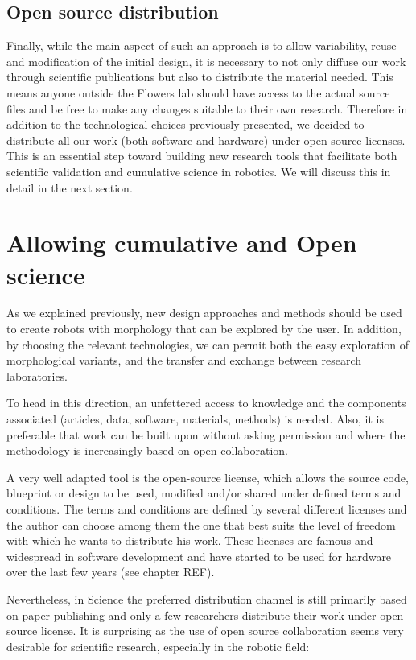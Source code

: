 \subsection{Open source distribution} %

Finally, while the main aspect of such an approach is to allow variability, reuse and modification of the initial design, it is necessary to not only diffuse our work through scientific publications but also to distribute the material needed.
This means anyone outside the Flowers lab should have access to the actual source files and be free to make any changes suitable to their own research. Therefore in addition to the technological choices previously presented, we decided to distribute all our work (both software and hardware) under open source licenses.
This is an essential step toward building new research tools that facilitate both scientific validation and cumulative science in robotics. We will discuss this in detail in the next section.


\section{Allowing cumulative and Open science} %
\label{sec:allow-cumulative-science}
As we explained previously, new design approaches and methods should be used to create robots with morphology that can be explored by the user. In addition, by choosing the relevant technologies, we can permit both  the easy exploration of morphological variants, and the transfer and exchange between research laboratories.

To head in this direction, an unfettered access to knowledge and the components associated (articles, data, software, materials, methods) is needed. Also, it is preferable that work can be built upon without asking permission and where the methodology is increasingly based on open collaboration.

A very well adapted tool is the open-source license, which allows the source code, blueprint or design to be used, modified and/or shared under defined terms and conditions. The terms and conditions are defined by several different licenses and the author can choose among them the one that best suits the level of freedom  with which he wants to distribute his work. These licenses are famous and widespread in software development and have started to be used for hardware over the last few years (see chapter REF).

Nevertheless, in Science the preferred distribution channel is still primarily based on paper publishing and only a few researchers distribute their work under open source license. It is surprising as the use of open source collaboration seems very desirable for scientific research, especially in the robotic field:

